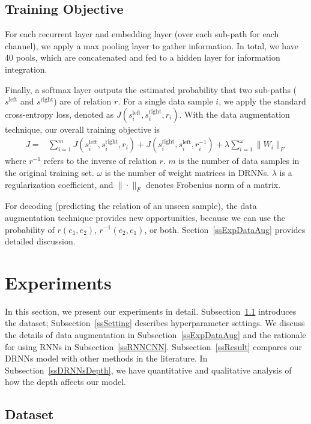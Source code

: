 \documentclass[11pt]{article}
\begin{document}
\subsection{Training Objective}\label{ssObjective}

For each recurrent layer and embedding layer (over each sub-path for each channel), we apply a max pooling layer to gather information. In total, we have 40 pools, which are concatenated and fed to a hidden layer for information integration.

Finally, a softmax layer outputs the estimated probability that two sub-paths ($s^\text{left}$ and $s^\text{right}$) are of relation $r$. For a single data sample $i$, we apply the standard cross-entropy loss, denoted as $J(s_i^\text{left}, s_i^\text{right}, r_i)$. With the data augmentation technique, our overall training objective is
\begin{align}\nonumber
J=&\sum_{i=1}^m J(s_i^\text{left}, s_i^\text{right}, r_i)+J(s_i^\text{right},s_i^\text{left}, r_i^{-1})
+\lambda\sum_{i=1}^\omega\|W_i\|_F
\end{align}
where $r^{-1}$ refers to the inverse of relation $r$. $m$ is the number of data samples in the original training set. $\omega$ is the number of weight matrices in DRNNs. $\lambda$ is a regularization coefficient, and $\|\cdot\|_F$ denotes Frobenius norm of a matrix.

For decoding (predicting the relation of an unseen sample), the data augmentation technique provides new opportunities, because we can use the probability of $r(e_1, e_2)$, $r^{-1}(e_2, e_1)$, or both. Section~\ref{ssExpDataAug} provides detailed discussion.

\section{Experiments}\label{sExperiment}

In this section, we present our experiments in detail.
Subsection~\ref{ssData} introduces the dataset;
Subsection~\ref{ssSetting} describes hyperparameter settings.
We discuss the details of data augmentation in Subsection~\ref{ssExpDataAug} and
the rationale for using RNNs in Subsection~\ref{ssRNNCNN}.
Subsection~\ref{ssResult} compares our DRNNs model with other methods in the literature.
In Subsection~\ref{ssDRNNsDepth}, we have quantitative and qualitative analysis of how the depth affects our model.


\subsection{Dataset}\label{ssData}
\end{document}
